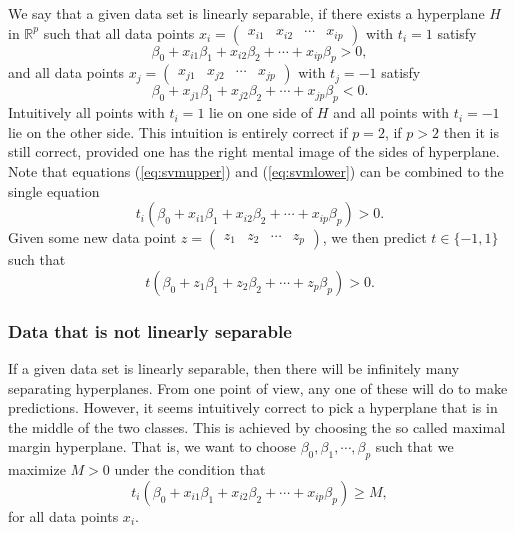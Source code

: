 \documentclass[parskip=half]{scrartcl}
\theoremstyle{definition}
\theoremstyle{remark}
\newcommand{\R}{\mathbb{R}}
\begin{document}
We say that a given data set is linearly separable, if there exists a hyperplane $H$ in $\R^p$ such that all data points $x_i = \begin{pmatrix} x_{i1} & x_{i2}  & \cdots & x_{ip} \end{pmatrix}$ with $t_i = 1$ satisfy 
\begin{equation} \label{eq:svmupper}
	\beta_0 + x_{i1} \beta_1 + x_{i2} \beta_2 + \cdots + x_{ip} \beta_p > 0,
\end{equation}
and all data points $x_j = \begin{pmatrix} x_{j1} & x_{j2}  & \cdots & x_{jp} \end{pmatrix}$ with $t_j = -1$ satisfy
\begin{equation} \label{eq:svmlower}
	\beta_0 + x_{j1} \beta_1 + x_{j2} \beta_2 + \cdots + x_{jp} \beta_p < 0.
\end{equation}
Intuitively all points with $t_i = 1$ lie on one side of $H$ and all points with $t_i = -1$ lie on the other side. 
This intuition is entirely correct if $p = 2$, if $p>2$ then it is still correct, provided one has the right mental image of the sides of hyperplane. 
Note that equations (\ref{eq:svmupper}) and (\ref{eq:svmlower}) can be combined to the single equation
\begin{equation} \label{eq:svmsep}
	t_i(\beta_0 + x_{i1} \beta_1 + x_{i2} \beta_2 + \cdots + x_{ip} \beta_p) > 0.
\end{equation}
Given some new data point $z = \begin{pmatrix} z_1 & z_2  & \cdots & z_p \end{pmatrix}$, we then predict $t \in \{-1,1\}$ such that
\[
	t(\beta_0 + z_1 \beta_1 + z_2 \beta_2 + \cdots + z_p \beta_p) > 0.
\] 

\subsubsection{Data that is not linearly separable}

If a given data set is linearly separable, then there will be infinitely many separating hyperplanes. 
From one point of view, any one of these will do to make predictions. 
However, it seems intuitively correct to pick a hyperplane that is in the middle of the two classes. 
This is achieved by choosing the so called maximal margin hyperplane.
That is, we want to choose $\beta_0, \beta_1, \cdots, \beta_p$ such that we maximize $M > 0$ under the condition that 
\[
	t_i(\beta_0 + x_{i1} \beta_1 + x_{i2} \beta_2 + \cdots + x_{ip} \beta_p) \geq M,
\] 
for all data points $x_i$.
\end{document}

